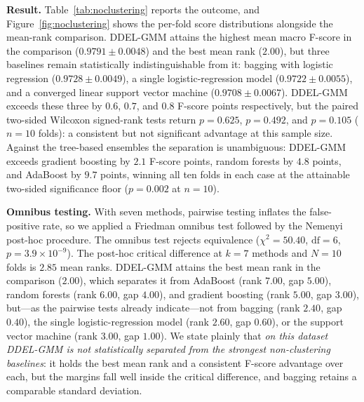 \documentclass[lettersize,journal]{IEEEtran}
\begin{document}
		\noindent \textbf{Result.} Table~\ref{tab:noclustering} reports the outcome, and Figure~\ref{fig:noclustering} shows the per-fold score distributions alongside the mean-rank comparison. DDEL-GMM attains the highest mean macro F-score in the comparison ($0.9791 \pm 0.0048$) and the best mean rank ($2.00$), but three baselines remain statistically indistinguishable from it: bagging with logistic regression ($0.9728 \pm 0.0049$), a single logistic-regression model ($0.9722 \pm 0.0055$), and a converged linear support vector machine ($0.9708 \pm 0.0067$). DDEL-GMM exceeds these three by $0.6$, $0.7$, and $0.8$ F-score points respectively, but the paired two-sided Wilcoxon signed-rank tests return $p = 0.625$, $p = 0.492$, and $p = 0.105$ ($n = 10$ folds): a consistent but not significant advantage at this sample size. Against the tree-based ensembles the separation is unambiguous: DDEL-GMM exceeds gradient boosting by $2.1$ F-score points, random forests by $4.8$ points, and AdaBoost by $9.7$ points, winning all ten folds in each case at the attainable two-sided significance floor ($p = 0.002$ at $n = 10$).
		
		\noindent \textbf{Omnibus testing.} With seven methods, pairwise testing inflates the false-positive rate, so we applied a Friedman omnibus test followed by the Nemenyi post-hoc procedure. The omnibus test rejects equivalence ($\chi^2 = 50.40$, $\mathrm{df} = 6$, $p = 3.9 \times 10^{-9}$). The post-hoc critical difference at $k = 7$ methods and $N = 10$ folds is $2.85$ mean ranks. DDEL-GMM attains the best mean rank in the comparison ($2.00$), which separates it from AdaBoost (rank $7.00$, gap $5.00$), random forests (rank $6.00$, gap $4.00$), and gradient boosting (rank $5.00$, gap $3.00$), but---as the pairwise tests already indicate---not from bagging (rank $2.40$, gap $0.40$), the single logistic-regression model (rank $2.60$, gap $0.60$), or the support vector machine (rank $3.00$, gap $1.00$). We state plainly that \emph{on this dataset DDEL-GMM is not statistically separated from the strongest non-clustering baselines}: it holds the best mean rank and a consistent F-score advantage over each, but the margins fall well inside the critical difference, and bagging retains a comparable standard deviation.
		
\end{document}
